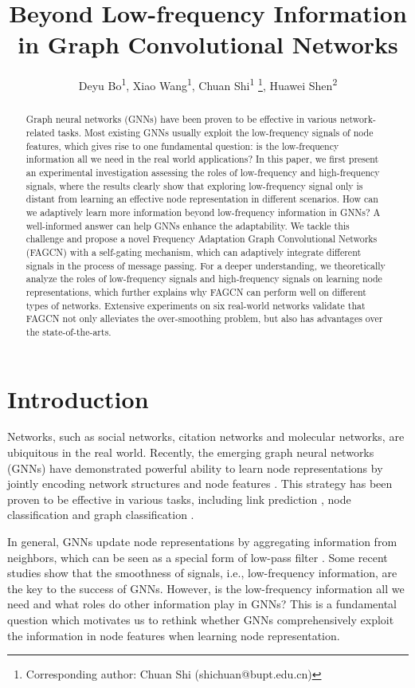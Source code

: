 \documentclass[letterpaper]{article} \usepackage{aaai21}  \usepackage{times}  \usepackage{helvet} \usepackage{courier}  \usepackage[hyphens]{url}  \usepackage{graphicx} \urlstyle{rm} \def\UrlFont{\rm}  \usepackage{natbib}  \usepackage{caption} \frenchspacing  \setlength{\pdfpagewidth}{8.5in}  \setlength{\pdfpageheight}{11in}
\title{Beyond Low-frequency Information in Graph Convolutional Networks}
\author{
	Deyu Bo\textsuperscript{\rm 1},
	Xiao Wang\textsuperscript{\rm 1},
	Chuan Shi\textsuperscript{\rm 1}	\thanks{Corresponding author: Chuan Shi (shichuan@bupt.edu.cn)},
	Huawei Shen\textsuperscript{\rm 2}
}
\begin{document}
\maketitle

\begin{abstract}
Graph neural networks (GNNs) have been proven to be effective in various network-related tasks. Most existing GNNs usually exploit the low-frequency signals of node features, which gives rise to one fundamental question: is the low-frequency information all we need in the real world applications? 
In this paper, we first present an experimental investigation assessing the roles of low-frequency and high-frequency signals, where the results clearly show that exploring low-frequency signal only is distant from learning an effective node representation in different scenarios. How can we adaptively learn more information beyond low-frequency information in GNNs? A well-informed answer can help GNNs enhance the adaptability. We tackle this challenge and propose a novel Frequency Adaptation Graph Convolutional Networks (FAGCN) with a self-gating mechanism, which can adaptively integrate different signals in the process of message passing. 
For a deeper understanding, we theoretically analyze the roles of low-frequency signals and high-frequency signals on learning node representations, which further explains why FAGCN can perform well on different types of networks.
Extensive experiments on six real-world networks validate that FAGCN not only alleviates the over-smoothing problem, but also has advantages over the state-of-the-arts.
\end{abstract}

\section{Introduction}
\label{introduction}


Networks, such as social networks, citation networks and molecular networks, are ubiquitous in the real world.
Recently, the emerging graph neural networks (GNNs) have demonstrated powerful ability to learn node representations by jointly encoding network structures and node features \cite{survey2, survey1, HINSurvey}.  This strategy has been proven to be effective in various tasks, including link prediction \cite{linkprediction}, node classification \cite{GCN, GAT} and graph classification \cite{graphclassification}.



In general, GNNs update node representations by aggregating information from neighbors, which can be seen as a special form of low-pass filter \cite{SGC, label2019li}. Some recent studies \cite{revisiting, GraphHeat} show that the smoothness of signals, i.e., low-frequency information, are the key to the success of GNNs.
However, is the low-frequency information all we need and what roles do other information play in GNNs? This is a fundamental question which motivates us to rethink whether GNNs comprehensively exploit the information in node features when learning node representation.
\end{document}
